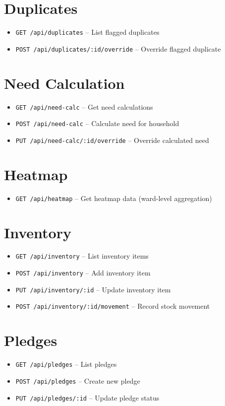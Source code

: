 \section{Duplicates}
\begin{itemize}[leftmargin=1.2cm]
    \item \texttt{GET /api/duplicates} -- List flagged duplicates
    \item \texttt{POST /api/duplicates/:id/override} -- Override flagged duplicate
\end{itemize}

\section{Need Calculation}
\begin{itemize}[leftmargin=1.2cm]
    \item \texttt{GET /api/need-calc} -- Get need calculations
    \item \texttt{POST /api/need-calc} -- Calculate need for household
    \item \texttt{PUT /api/need-calc/:id/override} -- Override calculated need
\end{itemize}

\section{Heatmap}
\begin{itemize}[leftmargin=1.2cm]
    \item \texttt{GET /api/heatmap} -- Get heatmap data (ward-level aggregation)
\end{itemize}

\section{Inventory}
\begin{itemize}[leftmargin=1.2cm]
    \item \texttt{GET /api/inventory} -- List inventory items
    \item \texttt{POST /api/inventory} -- Add inventory item
    \item \texttt{PUT /api/inventory/:id} -- Update inventory item
    \item \texttt{POST /api/inventory/:id/movement} -- Record stock movement
\end{itemize}

\section{Pledges}
\begin{itemize}[leftmargin=1.2cm]
    \item \texttt{GET /api/pledges} -- List pledges
    \item \texttt{POST /api/pledges} -- Create new pledge
    \item \texttt{PUT /api/pledges/:id} -- Update pledge status
\end{itemize}

